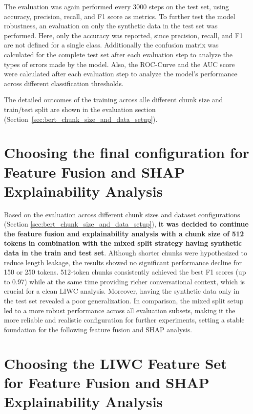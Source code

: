 The evaluation was again performed every 3000 steps on the test set, using accuracy, precision, recall, and F1 score as metrics. To further test the model robustness, an evaluation on only the synthetic data in the test set was performed. Here, only the accuracy was reported, since precision, recall, and F1 are not defined for a single class. Additionally the confusion matrix was calculated for the complete test set after each evaluation step to analyze the types of errors made by the model. Also, the ROC-Curve and the AUC score were calculated after each evaluation step to analyze the model's performance across different classification thresholds.

The detailed outcomes of the training across alle different chunk size and train/test split are shown in the evaluation section (Section~\ref{sec:bert_chunk_size_and_data_setup}).

\section{Choosing the final configuration for Feature Fusion and SHAP Explainability Analysis} 


Based on the evaluation across different chunk sizes and dataset configurations (Section \ref{sec:bert_chunk_size_and_data_setup}), \textbf{it was decided to continue the feature fusion and explainability analysis with a chunk size of 512 tokens in combination with the mixed split strategy having synthetic data in the train and test set}. Although shorter chunks were hypothesized to reduce length leakage, the results showed no significant performance decline for 150 or 250 tokens. 512-token chunks consistently achieved the best F1 scores (up to 0.97) while at the same time providing richer conversational context, which is crucial for a clean LIWC analysis. Moreover, having the synthetic data only in the test set revealed a poor generalization. In comparison, the mixed split setup led to a more robust performance across all evaluation subsets, making it the more reliable and realistic configuration for further experiments, setting a stable foundation for the following feature fusion and SHAP analysis.


\section{Choosing the LIWC Feature Set for Feature Fusion and SHAP Explainability Analysis} \label{sec:liwc-feature-selection}

